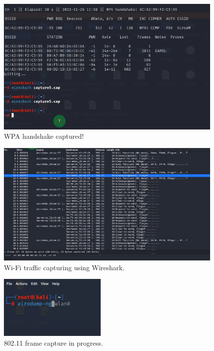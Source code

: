 \documentclass[11pt]{article}
\begin{document}
\begin{figure}[H]
	\centering
	\includegraphics[width=.95\textwidth]{03.png}
	\caption{WPA handshake captured!}
\end{figure}

\begin{figure}[H]
	\centering
	\includegraphics[width=.95\textwidth]{04.png}
	\caption{Wi-Fi traffic capturing using Wireshark.}
\end{figure}

\begin{figure}[H]
	\centering
	\includegraphics[width=.95\textwidth]{05.png}
	\caption{802.11 frame capture in progress.}
\end{figure}
\end{document}
